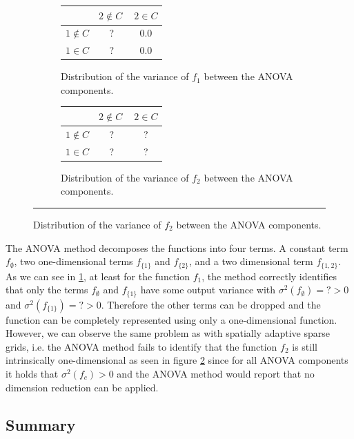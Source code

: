 \documentclass[
  a4paper,  %
  twoside,  %
  bibliography=totoc,
  headsepline,
  cleardoublepage=empty,
  parskip=half,
  draft=false
]{scrbook}
\newcommand{\delimit}{{\color{silver}\noindent\rule{\textwidth}{1pt}}}
\begin{document}
\begin{mdframed}[style=style]
\vspace{2.5mm}
\begin{figure}[H]
\begin{subfigure}{.50\textwidth}
  \centering
  \begin{tabular}{ l c c }
\hline \hline
& $2 \notin C~$ & $2 \in C$ \\
\hline
$1 \notin C$ & ? & 0.0\\
$1 \in C$ & ? & 0.0\\
\end{tabular}
  \caption{Distribution of the variance of $f_1$ between the ANOVA components.}
  \label{fig:anova_f1}
\end{subfigure}
\begin{subfigure}{.49\textwidth}
  \centering
  \begin{tabular}{ l c c }
\hline \hline
& $2 \notin C~$ & $2 \in C$ \\
\hline
$1 \notin C$ & ? & ?\\
$1 \in C$ & ? & ?\\
\end{tabular}
  \caption{Distribution of the variance of $f_2$ between the ANOVA components.}
  \label{fig:anova_f2}
\end{subfigure}
\delimit
{}
\label{fig:anova}
\end{figure}
\end{mdframed}

The ANOVA method decomposes the functions into four terms.
A constant term $f_\emptyset$, two one-dimensional terms $f_{\{1\}}$ and $f_{\{2\}}$, and a two dimensional term $f_{\{1,2\}}$.
As we can see in \cref{fig:anova_f1}, at least for the function $f_1$, the method correctly identifies that only the terms $f_\emptyset$ and $f_{\{1\}}$ have some output variance with $\sigma^2(f_\emptyset)=? > 0$ and $\sigma^2(f_{\{1\}})=? > 0$.
Therefore the other terms can be dropped and the function can be completely represented using only a one-dimensional function.
However, we can observe the same problem as with spatially adaptive sparse grids, i.e. the ANOVA method fails to identify that the function $f_2$ is still intrinsically one-dimensional as seen in figure \cref{fig:anova_f2} since for all ANOVA components it holds that $\sigma^2(f_{c}) > 0$ and the ANOVA method would report that no dimension reduction can be applied.

\subsection{Summary}
\end{document}
